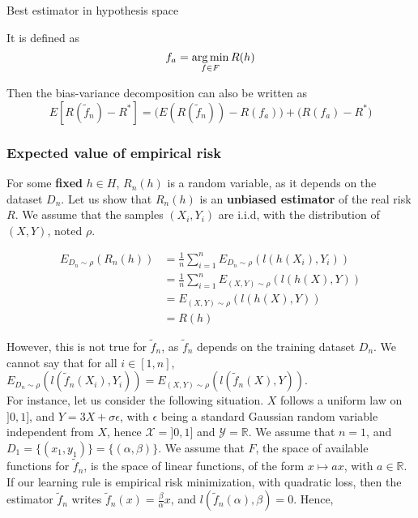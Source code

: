 \documentclass[
10pt, %
a4paper, %
oneside, %
headinclude,footinclude, %
BCOR5mm, %
]{scrartcl}
\begin{document}
\begin{remark}

\begin{definition}{Best estimator in hypothesis space}

    It is defined as
    \begin{equation*}
	f_a = \operatorname*{arg\,min}_{f\in F}R(h)
    \end{equation*}
\end{definition}

    Then the bias-variance decomposition can also be written as
\begin{equation*}
    E[R( \tilde{f}_n)-R^*] = \Big(E(R( \tilde{f}_n))- R(f_a)\Big) +\Big(R(f_a)-R^* \Big)
\end{equation*}
\end{remark}

\subsubsection{\large\color{Periwinkle}Expected value of empirical risk}

For some \textbf{{fixed}} $h\in H$, $R_n(h)$ is a random variable, as it depends on the dataset $D_n$. Let us show that $ R_n(h)$ is an \textbf{{unbiased estimator}} of the real risk $R$. We assume that the samples $(X_i, Y_i)$ are i.i.d, with the distribution of $(X,Y)$, noted $\rho$. 

    \begin{equation*}
	    \begin{aligned}
		E_{D_n\sim \rho}(R_n(h)) &= \frac{1}{n} \sum^{n}_{i=1} E_{D_n\sim \rho}(l(h(X_i), Y_i)) \\
		&= \frac{1}{n} \sum^{n}_{i=1} E_{(X,Y)\sim \rho}(l(h(X), Y)) \\
		&=  E_{(X,Y)\sim \rho}(l(h(X), Y)) \\
		&= R(h)
	    \end{aligned}
    \end{equation*}

    However, this is not true for $ \tilde{f}_n$, as $ \tilde{f}_n$ depends on the training dataset $ D_n$. We cannot say that for all $i\in [1, n]$, $E_{D_n\sim \rho}(l( \tilde{f}_n(X_i), Y_i)) = E_{(X,Y)\sim\rho}(l( \tilde{f}_n(X), Y))$.
    \\

    For instance, let us consider the following situation. $X$ follows a uniform law on $]0, 1]$, and $Y=3X+\sigma\epsilon$, with $\epsilon$ being a standard Gaussian random variable independent from $X$, hence $ \mathcal{X} = ]0, 1]$ and $ \mathcal{Y} = \mathbb{R} $. We assume that $n=1$, and $D_1 = \{(x_1, y_1)\}=\{(\alpha, \beta)\}$. We assume that $F$, the space of available functions for $ \tilde{f}_n$, is the space of linear functions, of the form $ x\mapsto ax$, with $a\in \mathbb{R}$. If our learning rule is empirical risk minimization, with quadratic loss, then the estimator $ \tilde{f}_n$ writes $ \tilde{f}_n(x)= \frac{\beta}{\alpha}x$, and $l( \tilde{f}_n(\alpha), \beta)=0$. Hence,
\end{document}
